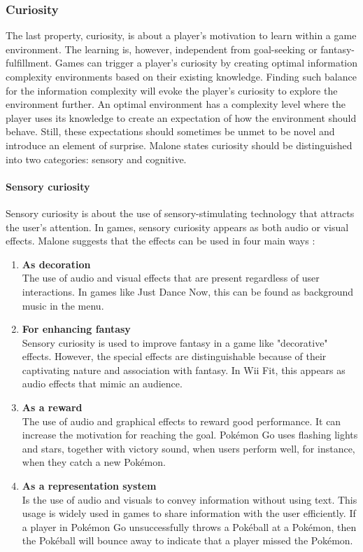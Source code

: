 \subsubsection{Curiosity}
The last property, curiosity, is about a player’s motivation to learn within a game environment. The learning is, however, independent from goal-seeking or fantasy-fulfillment. Games can trigger a player's curiosity by creating optimal information complexity environments based on their existing knowledge. Finding such balance for the information complexity will evoke the player’s curiosity to explore the environment further. An optimal environment has a complexity level where the player uses its knowledge to create an expectation of how the environment should behave. Still, these expectations should sometimes be unmet to be novel and introduce an element of surprise. Malone states curiosity should be distinguished into two categories: sensory and cognitive.

\paragraph*{Sensory curiosity} 
Sensory curiosity is about the use of sensory-stimulating technology that attracts the user’s attention. In games, sensory curiosity appears as both audio or visual effects. Malone suggests that the effects can be used in four main ways \citep{malone_what_1980}:

\begin{enumerate}
    \item \textbf{As decoration} \\
    The use of audio and visual effects that are present regardless of user interactions. In games like Just Dance Now, this can be found as background music in the menu.
    \item \textbf{For enhancing fantasy} \\
    Sensory curiosity is used to improve fantasy in a game like "decorative" effects. However, the special effects are distinguishable because of their captivating nature and association with fantasy. In Wii Fit, this appears as audio effects that mimic an audience.
    \item \textbf{As a reward} \\
    The use of audio and graphical effects to reward good performance. It can increase the motivation for reaching the goal. Pokémon Go uses flashing lights and stars, together with victory sound, when users perform well, for instance, when they catch a new Pokémon.
    \item \textbf{As a representation system} \\
    Is the use of audio and visuals to convey information without using text. This usage is widely used in games to share information with the user efficiently. If a player in Pokémon Go unsuccessfully throws a Pokéball at a Pokémon, then the Pokéball will bounce away to indicate that a player missed the Pokémon.
\end{enumerate}


